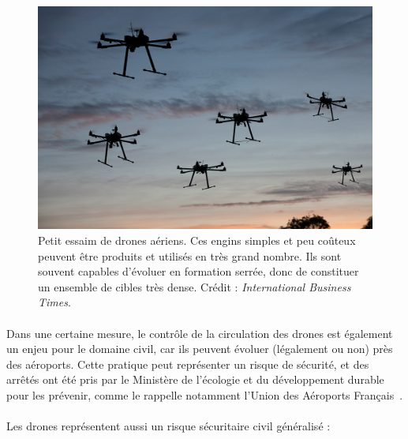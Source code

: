 	\begin{figure}[H]
		\centering
		\includegraphics[width=\textwidth]{figures/ch1/swarm}
		\caption{Petit essaim de drones aériens. Ces engins simples et peu coûteux peuvent être produits et utilisés en très grand nombre. Ils sont souvent capables d'évoluer en formation serrée, donc de constituer un ensemble de cibles très dense. Crédit : \emph{International Business Times}.}
		\label{fig:swarm}
	\end{figure}
	
	\paragraph*{}
	Dans une certaine mesure, le contrôle de la circulation des drones est également un enjeu pour le domaine civil, car ils peuvent évoluer (légalement ou non) près des aéroports. Cette pratique peut représenter un risque de sécurité, et des arrêtés ont été pris par le Ministère de l'écologie et du développement durable pour les prévenir, comme le rappelle notamment l'Union des Aéroports Français~\cite{dronesuaf}.
	
	\paragraph*{}
	Les drones représentent aussi un risque sécuritaire civil généralisé :
	
